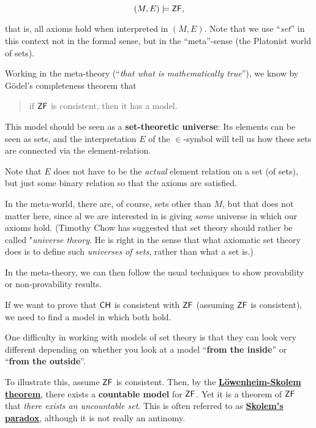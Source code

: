 \begin{equation}
(M,E) \models \mathsf{ZF},
\end{equation}

that is, all axioms hold when interpreted in $(M,E)$. Note that we use ``\textit{set}'' in this context not in the formal sense, but in the ``meta''-sense (the Platonist world of sets).

Working in the meta-theory (``\textit{that what is mathematically true}''), we know by Gödel's completeness theorem that

\begin{quote}
if $\mathsf{ZF}$ is consistent, then it has a model.
\end{quote}

This model should be seen as a \textbf{set-theoretic universe}: Its elements can be seen as sets, and the interpretation  $E$ of the $\in$-symbol will tell us how these sets are connected via the element-relation.

Note that $E$ does not have to be the \textit{actual} element relation on a set (of sets), but just some binary relation so that the axioms are satisfied.

In the meta-world, there are, of course, sets other than $M$, but that does not matter here, since al we are interested in is giving \textit{some} universe in which our axioms hold. (Timothy Chow has suggested that set theory should rather be called "\textit{universe theory}. He is right in the sense that what axiomatic set theory does is to define such \textit{universes of sets}, rather than what a set is.)

In the meta-theory, we can then follow the usual techniques to show provability or non-provability results.

If we want to prove that $\mathsf{CH}$ is consistent with $\mathsf{ZF}$ (assuming $\mathsf{ZF}$ is consistent), we need to find a model in which both hold.

One difficulty in working with models of set theory is that they can look very different depending on whether you look at a model ``\textbf{from the inside}'' or ``\textbf{from the outside}''.

To illustrate this, assume $\mathsf{ZF}$ is consistent. Then, by the \textbf{\href{https://en.wikipedia.org/wiki/L\%C3\%B6wenheim\%E2\%80\%93Skolem\_theorem}{Löwenheim-Skolem theorem}}, there exists a \textbf{countable model} for $\mathsf{ZF}$.
Yet it is a theorem of $\mathsf{ZF}$ that \textit{there exists an uncountable set}. This is often referred to as \textbf{\href{https://en.wikipedia.org/wiki/Skolem's\_paradox}{Skolem's paradox}}, although it is not really an antinomy.

